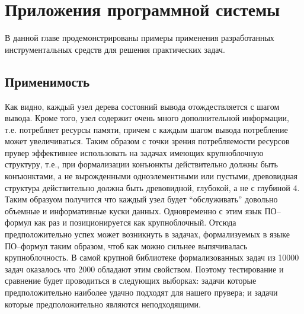 \chapter{Приложения программной системы}
\label{part:examples}

В данной главе продемонстрированы примеры применения разработанных инструментальных средств  для решения практических задач. %

\section{Применимость}
Как видно, каждый узел дерева состояний вывода отождествляется с шагом вывода. Кроме того, узел содержит очень много дополнительной информации, т.е. потребляет ресурсы памяти, причем с каждым шагом вывода потребление может увеличиваться. Таким образом с точки зрения потребляемости ресурсов прувер эффективнее использовать на задачах имеющих крупноблочную структуру, т.е., при формализации конъюнкты действительно должны быть конъюнктами, а не вырожденными одноэлементными или пустыми, древовидная структура действительно должна быть древовидной, глубокой, а не с глубиной 4. Таким образуом получится что каждый узел будет “обслуживать” довольно объемные и информативные куски данных. Одновременно с этим язык ПО--формул как раз и позиционируется как крупноблочный. Отсюда предположительно успех может возникнуть в задачах, формализуемых в языке ПО--формул таким образом, чтоб как можно сильнее выпячивалась крупноблочность. В самой крупной библиотеке формализованных задач из 10000 задач оказалось что 2000 обладают этим свойством. Поэтому тестирование и сравнение будет проводиться в следующих выборках: задачи которые предположительно наиболее удачно подходят для нашего прувера; и задачи которые предположительно являются неподходящими.




